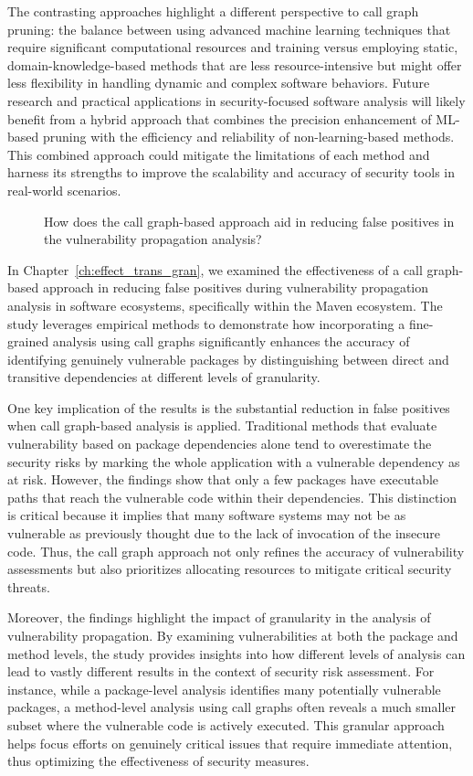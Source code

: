 The contrasting approaches highlight a different perspective to call graph pruning: the balance between using advanced machine learning techniques that require significant computational resources and training versus employing static, domain-knowledge-based methods that are less resource-intensive but might offer less flexibility in handling dynamic and complex software behaviors. Future research and practical applications in security-focused software analysis will likely benefit from a hybrid approach that combines the precision enhancement of ML-based pruning with the efficiency and reliability of non-learning-based methods. This combined approach could mitigate the limitations of each method and harness its strengths to improve the scalability and accuracy of security tools in real-world scenarios.

\begin{description}
\item[] How does the call graph-based approach aid in reducing false positives in the vulnerability propagation analysis?
\end{description}

In Chapter~\ref{ch:effect_trans_gran}, we examined the effectiveness of a call graph-based approach in reducing false positives during vulnerability propagation analysis in software ecosystems, specifically within the Maven ecosystem. The study leverages empirical methods to demonstrate how incorporating a fine-grained analysis using call graphs significantly enhances the accuracy of identifying genuinely vulnerable packages by distinguishing between direct and transitive dependencies at different levels of granularity.

One key implication of the results is the substantial reduction in false positives when call graph-based analysis is applied. Traditional methods that evaluate vulnerability based on package dependencies alone tend to overestimate the security risks by marking the whole application with a vulnerable dependency as at risk. However, the findings show that only a few packages have executable paths that reach the vulnerable code within their dependencies. This distinction is critical because it implies that many software systems may not be as vulnerable as previously thought due to the lack of invocation of the insecure code. Thus, the call graph approach not only refines the accuracy of vulnerability assessments but also prioritizes allocating resources to mitigate critical security threats.

Moreover, the findings highlight the impact of granularity in the analysis of vulnerability propagation. By examining vulnerabilities at both the package and method levels, the study provides insights into how different levels of analysis can lead to vastly different results in the context of security risk assessment. For instance, while a package-level analysis identifies many potentially vulnerable packages, a method-level analysis using call graphs often reveals a much smaller subset where the vulnerable code is actively executed. This granular approach helps focus efforts on genuinely critical issues that require immediate attention, thus optimizing the effectiveness of security measures.

